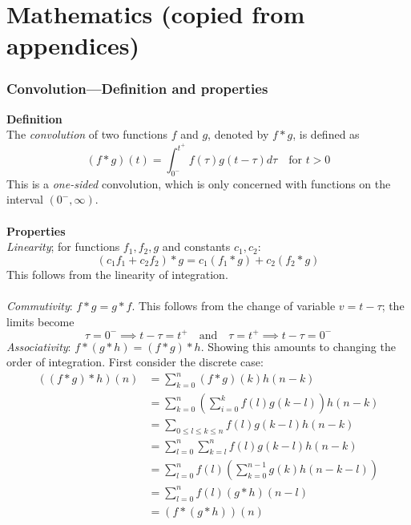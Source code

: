 \documentclass{report}
\begin{document}
\newpage
\appendix
\chapter{Mathematics (copied from appendices)}

\subsection{Convolution---Definition and properties}
\textbf{Definition}\\
The \textit{convolution} of two functions $f$ and $g$,
denoted by $f*g$, is defined as
\begin{equation*}
(f*g)(t)=\int^{t^+}_{0^-}f(\tau)g(t-\tau)d\tau\quad\text{for }t>0
\end{equation*}
This is a \textit{one-sided} convolution, which is only concerned with functions on the interval $(0^-,\infty)$.\\
\vspace{1mm}\\
\textbf{Properties}\\
\textit{Linearity}; for functions $f_1,f_2,g$ and constants $c_1,c_2$:
\begin{equation*}
(c_1f_1+c_2f_2)*g=c_1(f_1*g)+c_2(f_2*g)
\end{equation*}
This follows from the linearity of integration.\\
\vspace{1mm}\\
\textit{Commutivity}: $f*g=g*f$. This follows from the change of variable $v=t-\tau$; the limits become
\begin{equation*}
\tau=0^-\implies t-\tau=t^+\quad\text{and}\quad\tau=t^+\implies t-\tau=0^-
\end{equation*}
\textit{Associativity}: $f*(g*h)=(f*g)*h$. Showing this amounts to changing the order of integration. 
First consider the discrete case:
\begin{align*}
((f*g)*h)(n)&=\sum^n_{k=0}(f*g)(k)h(n-k)\\
&=\sum^n_{k=0}\left(\sum^k_{i=0}f(l)g(k-l)\right)h(n-k)\\
&=\sum_{0\leq l\leq k\leq n}f(l)g(k-l)h(n-k)\\
&=\sum^n_{l=0}\sum^n_{k=l}f(l)g(k-l)h(n-k)\\
&=\sum^n_{l=0}f(l)\left(\sum^{n-1}_{k=0}g(k)h(n-k-l)\right)\\
&=\sum^n_{l=0}f(l)(g*h)(n-l)\\
&=(f*(g*h))(n)
\end{align*}
\end{document}

